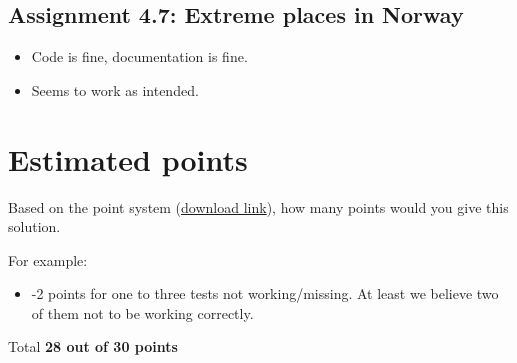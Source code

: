 \documentclass[a4paper]{article}
\begin{document}
\subsection*{Assignment 4.7: Extreme places in Norway}
\begin{itemize}
	\item Code is fine, documentation is fine.
    \item Seems to work as intended.
\end{itemize}

\section{Estimated points}\label{sec:points}
Based on the point system (\href{http://www.uio.no/studier/emner/matnat/ifi/INF3331/h15/assignments/review_rules.pdf}{download link}),
how many points would you give this solution.

For example:
\begin{itemize}
\item -2 points for one to three tests not working/missing. At least we believe two of them not to be working correctly.
\end{itemize}

Total \noindent\textbf{28 out of 30 points}




\end{document}
